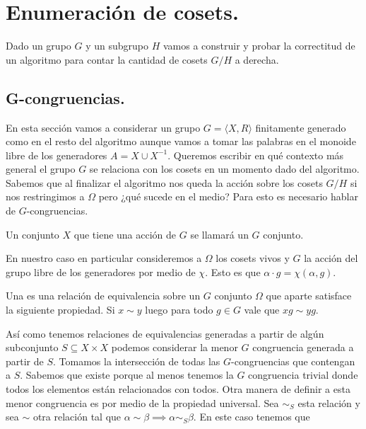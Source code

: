 \documentclass[tesis.tex]{subfiles}
\begin{document}
\chapter{Enumeración de cosets.}

Dado un grupo  $G$ y un subgrupo $H$  vamos a construir y probar la correctitud de un algoritmo para contar la cantidad de cosets $G/H$ a derecha.



\section{G-congruencias.}
En esta sección vamos a considerar un grupo $G = \langle X, R \rangle$ finitamente generado como en el resto del algoritmo aunque vamos a tomar las palabras en el monoide libre de los generadores $A = X \cup X^{-1}$.
Queremos escribir en qué contexto más general el grupo $G$ se relaciona con los cosets en un momento dado del algoritmo. 
Sabemos que al finalizar el algoritmo nos queda la acción sobre los cosets $G/H$ si nos restringimos a $\Omega$ pero ¿qué sucede en el medio?
Para esto es necesario hablar de $G$-congruencias.
\begin{deff}
    Un conjunto $X$ que tiene una acción de $G$ se llamará un $G$ conjunto.    
\end{deff}

En nuestro caso en particular consideremos a $\Omega$ los cosets vivos y $G$ la acción del grupo libre de los generadores por medio de $\chi$.
Esto es que $\alpha \cdot g = \chi(\alpha,g)$.


\begin{deff}
    Una  es una relación de equivalencia sobre un $G$ conjunto $\Omega$ que aparte satisface la siguiente propiedad.
    Si $x \sim y$ luego para todo $g \in G$ vale que $xg \sim yg$.
\end{deff}

Así como tenemos relaciones de equivalencias generadas a partir de algún subconjunto $S \subseteq X \times X$ podemos considerar la menor $G$ congruencia generada a partir de $S$.
Tomamos la intersección de todas las $G$-congruencias que contengan a $S$. 
Sabemos que existe porque al menos tenemos la $G$ congruencia trivial donde todos los elementos están relacionados con todos.
Otra manera de definir a esta menor congruencia es por medio de la propiedad universal.
Sea $\sim_S$ esta relación y sea $\sim$ otra relación tal que $\alpha \sim \beta \implies \alpha \sim_S \beta$. 
En este caso tenemos que
\end{document}
